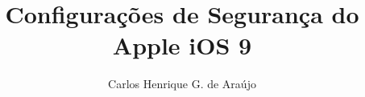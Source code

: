 \documentclass[12pt,oneside]{book}
\begin{document}
\frontmatter

\title{Configura\c c\~oes de Seguran\c ca do Apple iOS 9}
\author{Carlos Henrique G. de Ara\'ujo}

\maketitle

\tableofcontents

\mainmatter






\end{document}
